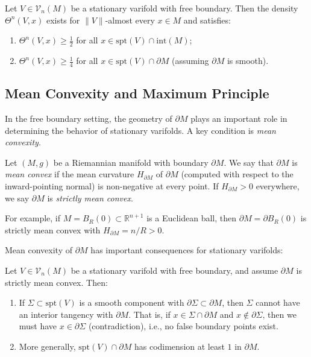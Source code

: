 \begin{corollary}\label{cor:density-bounds}
Let $V \in \mathcal{V}_n(M)$ be a stationary varifold with free boundary. Then the density
$\Theta^n(V, x)$ exists for $\|V\|$-almost every $x \in M$ and
satisfies:
\begin{enumerate}[label=(\roman*)]
    \item $\Theta^n(V, x) \geq \frac{1}{2}$ for all $x \in \mathrm{spt}(V) \cap \mathrm{int}(M)$;
    \item $\Theta^n(V, x) \geq \frac{1}{4}$ for all $x \in \mathrm{spt}(V) \cap \partial M$ (assuming
    $\partial M$ is smooth).
\end{enumerate}
\end{corollary}

\subsection{Mean Convexity and Maximum Principle}\label{subsec:max-principle}

In the free boundary setting, the geometry of $\partial M$ plays an important role in determining the
behavior of stationary varifolds. A key condition is \emph{mean convexity}.

\begin{definition}\label{def:mean-convexity}
Let $(M, g)$ be a Riemannian manifold with boundary $\partial M$. We say that $\partial M$ is \emph{mean convex} if the mean curvature $H_{\partial M}$ of $\partial M$ (computed with respect to the inward-pointing normal) is non-negative at every point. If $H_{\partial M} > 0$ everywhere, we say $\partial M$ is \emph{strictly mean convex}.
\end{definition}

\begin{remark}
For example, if $M = B_R(0) \subset \mathbb{R}^{n+1}$ is a Euclidean ball, then $\partial M = \partial B_R(0)$ is strictly mean convex with $H_{\partial M} = n/R > 0$.
\end{remark}

Mean convexity of $\partial M$ has important consequences for stationary varifolds:
\begin{theorem}\label{thm:max-principle}
Let $V \in \mathcal{V}_n(M)$ be a stationary varifold with free boundary, and assume $\partial M$ is
strictly mean convex. Then:
\begin{enumerate}[label=(\roman*)]
    \item If $\Sigma \subset \mathrm{spt}(V)$ is a smooth component with $\partial \Sigma \subset \partial M$, then $\Sigma$ cannot have an interior tangency with $\partial M$. That is, if $x \in \Sigma \cap \partial M$ and $x \notin \partial \Sigma$, then we must have $x \in \partial \Sigma$ (contradiction), i.e., no false boundary points exist.
    \item More generally, $\mathrm{spt}(V) \cap \partial M$ has codimension at least $1$ in $\partial M$.
\end{enumerate}
\end{theorem}
